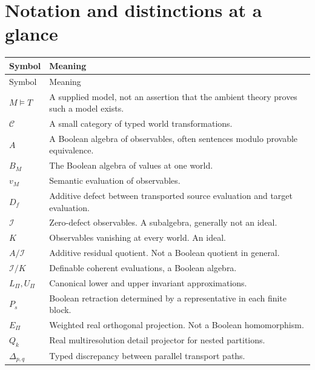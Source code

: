 \documentclass[11pt,letterpaper]{article}
\theoremstyle{definition}
\newcommand{\Inv}{\mathcal I}
\begin{document}
\section{Notation and distinctions at a glance}
\begin{longtable}{p{.22\linewidth}p{.70\linewidth}}
\toprule
Symbol & Meaning\\\midrule
\endfirsthead
\toprule Symbol & Meaning\\\midrule\endhead
$M\models T$ & A supplied model, not an assertion that the ambient theory proves such a model exists.\\
$\mathcal C$ & A small category of typed world transformations.\\
$A$ & A Boolean algebra of observables, often sentences modulo provable equivalence.\\
$B_M$ & The Boolean algebra of values at one world.\\
$v_M$ & Semantic evaluation of observables.\\
$D_f$ & Additive defect between transported source evaluation and target evaluation.\\
$\Inv$ & Zero-defect observables. A subalgebra, generally not an ideal.\\
$K$ & Observables vanishing at every world. An ideal.\\
$A/\Inv$ & Additive residual quotient. Not a Boolean quotient in general.\\
$\Inv/K$ & Definable coherent evaluations, a Boolean algebra.\\
$L_\Pi,U_\Pi$ & Canonical lower and upper invariant approximations.\\
$P_s$ & Boolean retraction determined by a representative in each finite block.\\
$E_\Pi$ & Weighted real orthogonal projection. Not a Boolean homomorphism.\\
$Q_k$ & Real multiresolution detail projector for nested partitions.\\
$\Delta_{p,q}$ & Typed discrepancy between parallel transport paths.\\
\bottomrule
\end{longtable}
\end{document}
